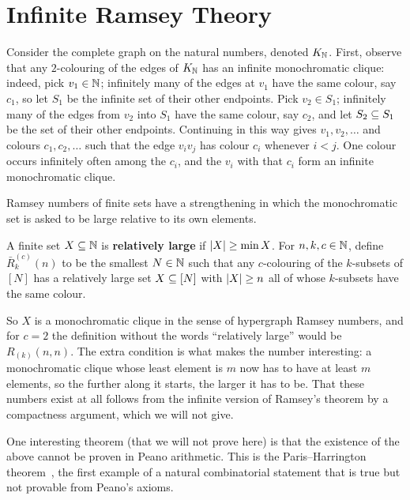 \section{Infinite Ramsey Theory}

Consider the complete graph on the natural numbers, denoted $K_{\mathbb{N}}$. First, observe that any $2$-colouring of the edges of $K_{\mathbb{N}}$ has an infinite monochromatic clique: indeed, pick $v_1 \in \mathbb{N}$; infinitely many of the edges at $v_1$ have the same colour, say $c_1$, so let $S_1$ be the infinite set of their other endpoints. Pick $v_2 \in S_1$; infinitely many of the edges from $v_2$ into $S_1$ have the same colour, say $c_2$, and let $S_2 \subseteq S_1$ be the set of their other endpoints. Continuing in this way gives $v_1, v_2, \ldots$ and colours $c_1, c_2, \ldots$ such that the edge $v_i v_j$ has colour $c_i$ whenever $i < j$. One colour occurs infinitely often among the $c_i$, and the $v_i$ with that $c_i$ form an infinite monochromatic clique.

Ramsey numbers of finite sets have a strengthening in which the monochromatic set is asked to be large relative to its own elements.

\begin{boxdefinition}
    A finite set $X \subseteq \mathbb{N}$ is \textbf{relatively large} if $\left\lvert X \right\rvert \geq \min X$. For $n, k, c \in \mathbb{N}$, define $\bar{R}^{(c)}_k(n)$ to be the smallest $N \in \mathbb{N}$ such that any $c$-colouring of the $k$-subsets of $[N]$ has a relatively large set $X \subseteq [N]$ with $\left\lvert X \right\rvert \geq n$ all of whose $k$-subsets have the same colour.
\end{boxdefinition}

So $X$ is a monochromatic clique in the sense of hypergraph Ramsey numbers, and for $c = 2$ the definition without the words ``relatively large'' would be $R_{(k)}(n, n)$. The extra condition is what makes the number interesting: a monochromatic clique whose least element is $m$ now has to have at least $m$ elements, so the further along it starts, the larger it has to be. That these numbers exist at all follows from the infinite version of Ramsey's theorem by a compactness argument, which we will not give.

One interesting theorem (that we will not prove here) is that the existence of the above cannot be proven in Peano arithmetic. This is the Paris--Harrington theorem~\cite{ParisHarrington}, the first example of a natural combinatorial statement that is true but not provable from Peano's axioms.
